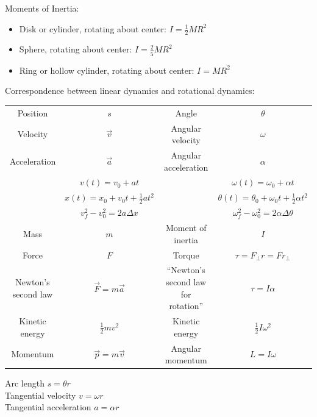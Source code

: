 \documentclass[12pt]{article}
\begin{document}
\newpage
\centerline{}


Moments of Inertia:
\begin{itemize}
  \item{Disk or cylinder, rotating about center: $I = \frac{1}{2}MR^2$}
  \item{Sphere, rotating about center: $I = \frac{2}{5}MR^2$}
  \item{Ring or hollow cylinder, rotating about center: $I = MR^2$}
\end{itemize}

\bigskip
\bigskip
\bigskip

Correspondence between linear dynamics and rotational dynamics: 
  \scriptsize

\begin{tabular}{| c | c | c | c |}
  \hline
  Position & $s$ & Angle & $\theta$  \\
  Velocity & $\vec v$ & Angular velocity & $\omega$  \\
  Acceleration & $\vec a$ & Angular acceleration & $\alpha$  \\
  \hline
                                   & $v(t) = v_0 + at$ & & $\omega(t) = \omega_0 + \alpha t$ \\
                                   & $x(t) = x_0 + v_0 t + \frac{1}{2} at^2$ & & $\theta(t) = \theta_0 + \omega_0 t + \frac{1}{2} \alpha t^2$ \\
                                   & $v_f^2 - v_0^2 = 2a \Delta x$ & & $\omega_f^2 - \omega_0^2 = 2 \alpha \Delta \theta$ \\
  \hline
  Mass & $m$ & Moment of inertia & $I$ \\
  \hline
  Force & $F$ & Torque & $\tau = F_\perp r = F r_\perp$ \\
  \hline
  Newton's second law & $\vec F = m \vec a$ & ``Newton's second law for rotation'' & $\tau = I \alpha$ \\
  \hline
  Kinetic energy & $\frac{1}{2} mv^2$ & Kinetic energy & $\frac{1}{2}I\omega^2$ \\
  \hline
  Momentum & $\vec p = m \vec v$ & Angular momentum & $L = I \omega$ \\
  \hline
\end{tabular}

\bigskip
\bigskip
\bigskip

Arc length $s=\theta r$ \\
Tangential velocity $v=\omega r$ \\
Tangential acceleration $a=\alpha r$




 
\end{document}
